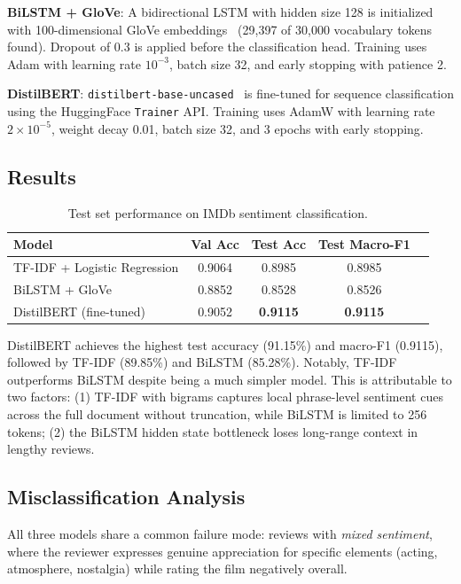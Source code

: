 \documentclass[12pt,a4paper]{article}
\begin{document}
\textbf{BiLSTM + GloVe}: A bidirectional LSTM with hidden size 128 is initialized with 100-dimensional GloVe embeddings~\citep{pennington2014glove} (29{,}397 of 30{,}000 vocabulary tokens found). Dropout of 0.3 is applied before the classification head. Training uses Adam with learning rate $10^{-3}$, batch size 32, and early stopping with patience 2.

\textbf{DistilBERT}: \texttt{distilbert-base-uncased}~\citep{sanh2019distilbert} is fine-tuned for sequence classification using the HuggingFace \texttt{Trainer} API. Training uses AdamW with learning rate $2 \times 10^{-5}$, weight decay 0.01, batch size 32, and 3 epochs with early stopping.

\subsection{Results}

\begin{table}[H]
\centering
\caption{Test set performance on IMDb sentiment classification.}
\label{tab:q1_results}
\begin{tabular}{lcccc}
\toprule
\textbf{Model} & \textbf{Val Acc} & \textbf{Test Acc} & \textbf{Test Macro-F1} \\
\midrule
TF-IDF + Logistic Regression & 0.9064 & 0.8985 & 0.8985 \\
BiLSTM + GloVe               & 0.8852 & 0.8528 & 0.8526 \\
DistilBERT (fine-tuned)      & 0.9052 & \textbf{0.9115} & \textbf{0.9115} \\
\bottomrule
\end{tabular}
\end{table}

DistilBERT achieves the highest test accuracy (91.15\%) and macro-F1 (0.9115), followed by TF-IDF (89.85\%) and BiLSTM (85.28\%). Notably, TF-IDF outperforms BiLSTM despite being a much simpler model. This is attributable to two factors: (1) TF-IDF with bigrams captures local phrase-level sentiment cues across the full document without truncation, while BiLSTM is limited to 256 tokens; (2) the BiLSTM hidden state bottleneck loses long-range context in lengthy reviews.

\subsection{Misclassification Analysis}

All three models share a common failure mode: reviews with \textit{mixed sentiment}, where the reviewer expresses genuine appreciation for specific elements (acting, atmosphere, nostalgia) while rating the film negatively overall.
\end{document}
